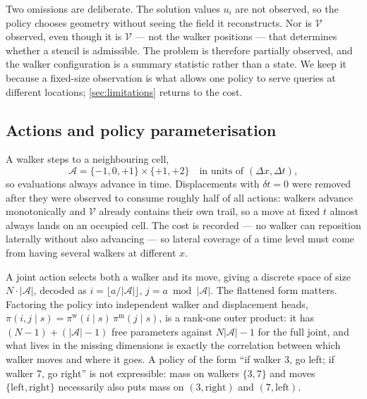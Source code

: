 Two omissions are deliberate. The solution values $u_i$ are not observed, so
the policy chooses geometry without seeing the field it reconstructs. Nor is
$\mathcal{V}$ observed, even though it is $\mathcal{V}$ --- not the walker
positions --- that determines whether a stencil is admissible. The problem is
therefore partially observed, and the walker configuration is a summary
statistic rather than a state. We keep it because a fixed-size observation is
what allows one policy to serve queries at different locations;
\cref{sec:limitations} returns to the cost.

\subsection{Actions and policy parameterisation}
\label{sec:mdp_action}

A walker steps to a neighbouring cell,
%
\begin{equation}
  \mathcal{A} = \{-1,0,+1\} \times \{+1,+2\}
  \quad\text{in units of } (\Delta x, \Delta t),
  \label{eq:action_set}
\end{equation}
%
so evaluations always advance in time. Displacements with $\delta t = 0$ were
removed after they were observed to consume roughly half of all actions:
walkers advance monotonically and $\mathcal{V}$ already contains their own
trail, so a move at fixed $t$ almost always lands on an occupied cell. The
cost is recorded --- no walker can reposition laterally without also advancing
--- so lateral coverage of a time level must come from having several walkers
at different $x$.

A joint action selects both a walker and its move, giving a discrete space of
size $N \cdot |\mathcal{A}|$, decoded as
$i = \lfloor a/|\mathcal{A}| \rfloor$, $j = a \bmod |\mathcal{A}|$. The
flattened form matters. Factoring the policy into independent walker and
displacement heads,
$\pi(i,j \mid s) = \pi^{\mathrm{w}}(i \mid s)\,\pi^{\mathrm{m}}(j \mid s)$, is
a rank-one outer product: it has $(N-1) + (|\mathcal{A}|-1)$ free parameters
against $N|\mathcal{A}|-1$ for the full joint, and what lives in the missing
dimensions is exactly the correlation between which walker moves and where it
goes. A policy of the form ``if walker 3, go left; if walker 7, go right'' is
not expressible: mass on walkers $\{3,7\}$ and moves $\{\mathrm{left},
\mathrm{right}\}$ necessarily also puts mass on $(3,\mathrm{right})$ and
$(7,\mathrm{left})$.

